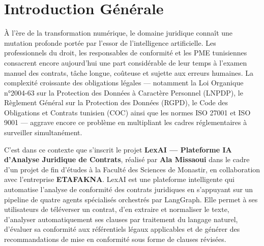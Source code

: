\documentclass[12pt,a4paper,twoside]{report}
\begin{document}


\tableofcontents
\clearpage

\listoftables
\clearpage

\listoffigures
\clearpage




\clearpage


\pagestyle{fancy}



\chapter*{Introduction Générale}

\vspace{1em}

À l'ère de la transformation numérique, le domaine juridique connaît une mutation profonde portée par l'essor de l'intelligence artificielle. Les professionnels du droit, les responsables de conformité et les PME tunisiennes consacrent encore aujourd'hui une part considérable de leur temps à l'examen manuel des contrats, tâche longue, coûteuse et sujette aux erreurs humaines. La complexité croissante des obligations légales — notamment la Loi Organique n°2004-63 sur la Protection des Données à Caractère Personnel (LNPDP), le Règlement Général sur la Protection des Données (RGPD), le Code des Obligations et Contrats tunisien (COC) ainsi que les normes ISO 27001 et ISO 9001 — aggrave encore ce problème en multipliant les cadres réglementaires à surveiller simultanément.

\vspace{1em}

C'est dans ce contexte que s'inscrit le projet \textbf{LexAI — Plateforme IA d'Analyse Juridique de Contrats}, réalisé par \textbf{Ala Missaoui} dans le cadre d'un projet de fin d'études à la Faculté des Sciences de Monastir, en collaboration avec l'entreprise \textbf{ETAFAKNA}. LexAI est une plateforme intelligente qui automatise l'analyse de conformité des contrats juridiques en s'appuyant sur un pipeline de quatre agents spécialisés orchestrés par LangGraph. Elle permet à ses utilisateurs de téléverser un contrat, d'en extraire et normaliser le texte, d'analyser automatiquement ses clauses par traitement du langage naturel, d'évaluer sa conformité aux référentiels légaux applicables et de générer des recommandations de mise en conformité sous forme de clauses révisées.
\end{document}
